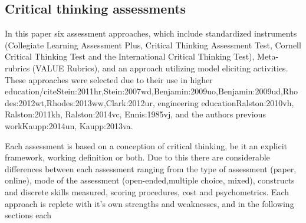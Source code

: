 \subsection{Critical thinking assessments}

In this paper six assessment approaches, which include standardized instruments (Collegiate Learning Assessment Plus, Critical Thinking Assessment Test, Cornell Critical Thinking Test and the International Critical Thinking Test), Meta-rubrics (VALUE Rubrics), and an approach utilizing model eliciting activities.  These approaches were selected due to their use in higher education/cite{Stein:2011hr,Stein:2007wd,Benjamin:2009uo,Benjamin:2009ud,Rhodes:2012wt,Rhodes:2013ww,Clark:2012ur}, engineering education{Ralston:2010vh, Ralston:2011kh, Ralston:2014vc, Ennis:1985vj}, and the authors previous work{Kaupp:2014un, Kaupp:2013va}.

Each assessment is based on a conception of critical thinking, be it an explicit framework, working definition or both.  Due to this there are considerable differences between each assessment ranging from the type of assessment (paper, online), mode of the assessment (open-ended,multiple choice, mixed), constructs and discrete skills measured, scoring procedures, cost and psychometrics.   Each approach is replete with it’s own strengths and weaknesses, and in the following sections each 
